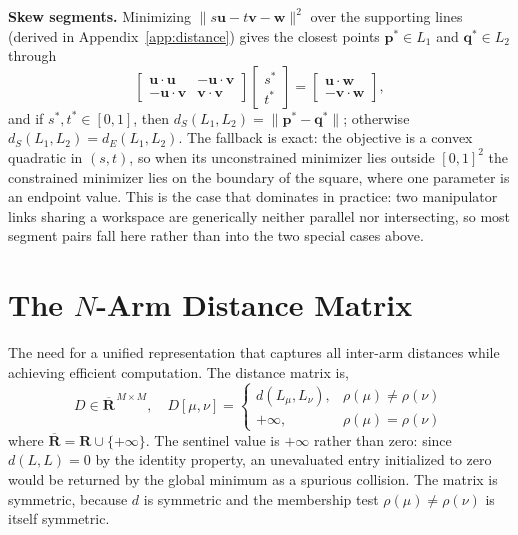 \textbf{Skew segments.} Minimizing $\lVert s\mathbf{u} - t\mathbf{v} - \mathbf{w} \rVert^2$ over the
supporting lines (derived in Appendix~\ref{app:distance}) gives the closest points $\mathbf{p}^* \in L_1$ and $\mathbf{q}^* \in L_2$ through
\begin{equation}
\begin{bmatrix} \mathbf{u}\cdot\mathbf{u} & -\mathbf{u}\cdot\mathbf{v} \\
-\mathbf{u}\cdot\mathbf{v} & \mathbf{v}\cdot\mathbf{v} \end{bmatrix}
\begin{bmatrix} s^* \\ t^* \end{bmatrix} =
\begin{bmatrix} \mathbf{u}\cdot\mathbf{w} \\ -\mathbf{v}\cdot\mathbf{w} \end{bmatrix},
\label{eq:dm_skew}
\end{equation}
and if $s^*, t^* \in [0,1]$, then $d_S(L_1, L_2) = \lVert \mathbf{p}^* - \mathbf{q}^* \rVert$;
otherwise $d_S(L_1, L_2) = d_E(L_1, L_2)$. The fallback is exact: the objective is a convex quadratic
in $(s,t)$, so when its unconstrained minimizer lies outside $[0,1]^2$ the constrained minimizer lies
on the boundary of the square, where one parameter is an endpoint value. This is the case that
dominates in practice: two manipulator links sharing a workspace are generically neither parallel nor
intersecting, so most segment pairs fall here rather than into the two special cases above.

\section{The \texorpdfstring{$N$}{N}-Arm Distance Matrix}\label{sec:dm_matrix}

The need for a unified representation that captures all inter-arm distances while achieving efficient computation. The distance matrix is,
\begin{equation}
{D} \in \overline{\mathbf{R}}^{\,M \times M}, \quad
D[\mu,\nu] =
\begin{cases}
d(L_{\mu}, L_{\nu}), & \rho(\mu) \neq \rho(\nu)\\
+\infty, & \rho(\mu) = \rho(\nu)
\end{cases}
\label{dist_matrix}
\end{equation}
where $\overline{\mathbf{R}} = \mathbf{R} \cup \{+\infty\}$. The sentinel value is $+\infty$ rather than zero: since $d(L,L) = 0$ by the identity property, an unevaluated entry initialized to zero would be returned by the global minimum as a spurious collision. The matrix is symmetric, because $d$ is symmetric and the membership test $\rho(\mu) \neq \rho(\nu)$ is itself symmetric.


